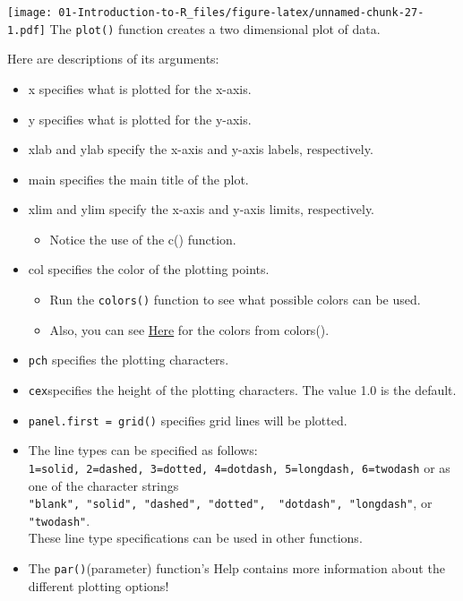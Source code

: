 \documentclass[
]{book}
\providecommand{\tightlist}{%
  \setlength{\itemsep}{0pt}\setlength{\parskip}{0pt}}
\theoremstyle{definition}
\theoremstyle{definition}
\theoremstyle{definition}
\theoremstyle{definition}
\theoremstyle{remark}
\begin{document}
\texttt{[image: 01-Introduction-to-R\_files/figure-latex/unnamed-chunk-27-1.pdf]}
The \texttt{plot()} function creates a two dimensional plot of data.

Here are descriptions of its arguments:

\begin{itemize}
\item
  x specifies what is plotted for the x-axis.
\item
  y specifies what is plotted for the y-axis.
\item
  xlab and ylab specify the x-axis and y-axis labels, respectively.
\item
  main specifies the main title of the plot.
\item
  xlim and ylim specify the x-axis and y-axis limits, respectively.

  \begin{itemize}
  \tightlist
  \item
    Notice the use of the c() function.
  \end{itemize}
\item
  col specifies the color of the plotting points.

  \begin{itemize}
  \tightlist
  \item
    Run the \texttt{colors()} function to see what possible colors can be used.
  \item
    Also, you can see \href{https://github.com/EarlGlynn/colorchart/wiki/Color-Chart-in-R}{Here} for the colors from colors().
  \end{itemize}
\item
  \texttt{pch} specifies the plotting characters.
\item
  \texttt{cex}specifies the height of the plotting characters.
  The value 1.0 is the default.
\item
  \texttt{panel.first\ =\ grid()} specifies grid lines will be plotted.
\item
  The line types can be specified as follows:
  \texttt{1=solid,\ 2=dashed,\ 3=dotted,\ 4=dotdash,\ 5=longdash,\ 6=twodash} or as one of the character strings \texttt{"blank",\ "solid",\ "dashed",\ "dotted",\ \ "dotdash",\ "longdash"}, or \texttt{"twodash"}.\\
  These line type specifications can be used in other functions.\\
\item
  The \texttt{par()}(parameter) function's Help contains more information about the different plotting options!
\end{itemize}
\end{document}
